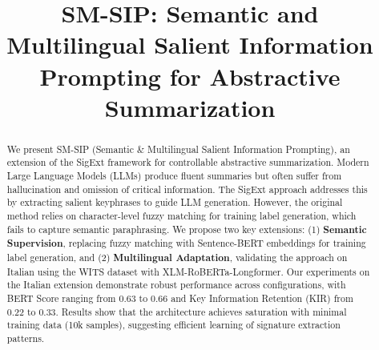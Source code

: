 \documentclass[conference]{IEEEtran}
\begin{document}
\title{SM-SIP: Semantic and Multilingual Salient Information Prompting for Abstractive Summarization}

\author{
\and
{}
\and
{}
\and
{}
\and
{}
}

\maketitle

\begin{abstract}
We present SM-SIP (Semantic \& Multilingual Salient Information Prompting), an extension of the SigExt framework for controllable abstractive summarization. Modern Large Language Models (LLMs) produce fluent summaries but often suffer from hallucination and omission of critical information. The SigExt approach addresses this by extracting salient keyphrases to guide LLM generation. However, the original method relies on character-level fuzzy matching for training label generation, which fails to capture semantic paraphrasing. We propose two key extensions: (1) \textbf{Semantic Supervision}, replacing fuzzy matching with Sentence-BERT embeddings for training label generation, and (2) \textbf{Multilingual Adaptation}, validating the approach on Italian using the WITS dataset with XLM-RoBERTa-Longformer. Our experiments on the Italian extension demonstrate robust performance across configurations, with BERT Score ranging from 0.63 to 0.66 and Key Information Retention (KIR) from 0.22 to 0.33. Results show that the architecture achieves saturation with minimal training data (10k samples), suggesting efficient learning of signature extraction patterns.
\end{abstract}
\end{document}
